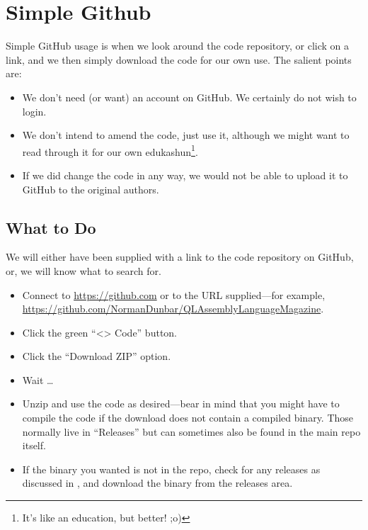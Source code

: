 \chapter{Simple Github}\label{chapter: Simple GitHub}

Simple GitHub usage is when we look around the code repository, or click on a link, and we then simply download the code for our own use. The salient points are:

\begin{itemize}
    \item We don't need (or want) an account on GitHub. We certainly do not wish to login.
    \item We don't intend to amend the code, just use it, although we might want to read through it for our own edukashun\footnote{It's like an education, but better! ;o)}.
    \item If we did change the code in any way, we would not be able to upload it to GitHub to the original authors.
\end{itemize}

\section{What to Do}

We will either have been supplied with a link to the code repository on GitHub, or, we will know what to search for.

\begin{itemize}
    \item Connect to \url{https://github.com} or to the URL supplied---for example, \url{https://github.com/NormanDunbar/QLAssemblyLanguageMagazine}.
    \item Click the green ``<> Code'' button.
    \item Click the ``Download ZIP'' option.
    \item Wait \ldots
    \item Unzip and use the code as desired---bear in mind that you might have to compile the code if the download does not contain a compiled binary. Those normally live in ``Releases'' but can sometimes also be found in the main repo itself.
    \item If the binary you wanted is not in the repo, check for any releases as discussed in , and download the binary from the releases area.
\end{itemize}